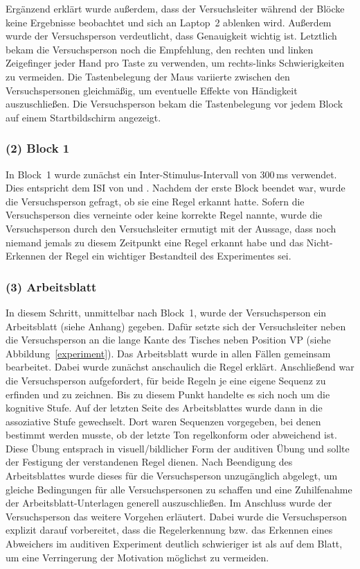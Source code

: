\documentclass[doc,a4paper,12pt]{apa6}
\begin{document}
Ergänzend erklärt wurde außerdem, dass der Versuchsleiter während der Blöcke keine Ergebnisse beobachtet und sich an Laptop~2 ablenken wird. Außerdem wurde der Versuchsperson verdeutlicht, dass Genauigkeit wichtig ist. Letztlich bekam die Versuchsperson noch die Empfehlung, den rechten und linken Zeigefinger jeder Hand pro Taste zu verwenden, um rechts-links Schwierigkeiten zu vermeiden. Die Tastenbelegung der Maus variierte zwischen den Versuchspersonen gleichmäßig, um eventuelle Effekte von Händigkeit auszuschließen. Die Versuchsperson bekam die Tastenbelegung vor jedem Block auf einem Startbildschirm angezeigt.

\subsubsection{(2) Block 1}

In Block~1 wurde zunächst ein Inter-Stimulus-Intervall von 300\,ms verwendet. Dies entspricht dem ISI von \textcite{paavilainen2007preattentive} und \textcite{bendixen2008rapid}. Nachdem der erste Block beendet war, wurde die Versuchsperson gefragt, ob sie eine Regel erkannt hatte. Sofern die Versuchsperson dies verneinte oder keine korrekte Regel nannte, wurde die Versuchsperson durch den Versuchsleiter ermutigt mit der Aussage, dass noch niemand jemals zu diesem Zeitpunkt eine Regel erkannt habe und das Nicht-Erkennen der Regel ein wichtiger Bestandteil des Experimentes sei.

\subsubsection{(3) Arbeitsblatt}

In diesem Schritt, unmittelbar nach Block~1, wurde der Versuchsperson ein Arbeitsblatt (siehe Anhang) gegeben. Dafür setzte sich der Versuchsleiter neben die Versuchsperson an die lange Kante des Tisches neben Position VP (siehe Abbildung~\ref{experiment}). Das Arbeitsblatt wurde in allen Fällen gemeinsam bearbeitet. Dabei wurde zunächst anschaulich die Regel erklärt. Anschließend war die Versuchsperson aufgefordert, für beide Regeln je eine eigene Sequenz zu erfinden und zu zeichnen. Bis zu diesem Punkt handelte es sich noch um die kognitive Stufe. Auf der letzten Seite des Arbeitsblattes wurde dann in die assoziative Stufe gewechselt. Dort waren Sequenzen vorgegeben, bei denen bestimmt werden musste, ob der letzte Ton regelkonform oder abweichend ist. Diese Übung entsprach in visuell/bildlicher Form der auditiven Übung und sollte der Festigung der verstandenen Regel dienen. Nach Beendigung des Arbeitsblattes wurde dieses für die Versuchsperson unzugänglich abgelegt, um gleiche Bedingungen für alle Versuchspersonen zu schaffen und eine Zuhilfenahme der Arbeitsblatt-Unterlagen generell auszuschließen. Im Anschluss wurde der Versuchsperson das weitere Vorgehen erläutert. Dabei wurde die Versuchsperson explizit darauf vorbereitet, dass die Regelerkennung bzw. das Erkennen eines Abweichers im auditiven Experiment deutlich schwieriger ist als auf dem Blatt, um eine Verringerung der Motivation möglichst zu vermeiden.
\end{document}
